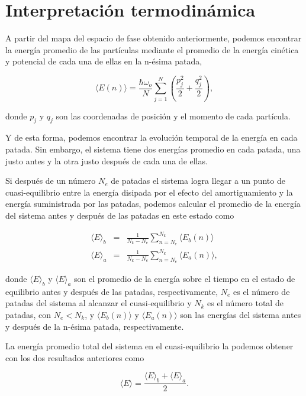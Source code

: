 \documentclass[letterpaper,12pt,oneside]{book}
\begin{document}
	\section{Interpretaci\'on termodin\'amica}
	
	A partir del mapa del espacio de fase obtenido anteriormente, podemos encontrar la energía promedio de las partículas mediante el promedio de la energía cinética y potencial de cada una de ellas en la n-ésima patada,
	
	\begin{equation}
	\langle E(n) \rangle = \frac{\hbar\omega_o}{N}\sum_{j=1}^{N} (\frac{p_j^2}{2} + \frac{q_j^2}{2}),
	\end{equation}
	
	\noindent donde $p_j$ y $q_j$ son las coordenadas de posición y el momento de cada partícula.
	
	
	Y de esta forma, podemos encontrar la evolución temporal de la energía en cada patada. Sin embargo, el sistema tiene dos energías promedio en cada patada, una justo antes y la otra justo después de cada una de ellas.
	
	Si después de un número $N_e$ de patadas el sistema logra llegar a un punto de cuasi-equilibrio entre la energía disipada por el efecto del amortiguamiento y la energía suministrada por las patadas, podemos calcular el promedio de la energía del sistema antes y después de las patadas en este estado como
	
	\begin{eqnarray}
	\langle E \rangle_b &=& \frac{1}{N_k - N_e} \sum_{n = N_e}^{N_k}  \langle E_b(n)\rangle \label{Eq.MHBefore}\\ 
	\langle E \rangle_a &=& \frac{1}{N_k - N_e} \sum_{n = N_e}^{N_k}  \langle E_a(n) \rangle , \label{Eq.MHafter}
	\end{eqnarray}
	
	\noindent donde $\langle E \rangle_b$ y $ \langle E \rangle_a $ son el promedio de la energía sobre el tiempo en el estado de equilibrio antes y después de las patadas, respectivamente, $N_e$ es el número de patadas del sistema al alcanzar el cuasi-equilibrio y $N_k$ es el número total de patadas, con $N_e<N_k$, y $\langle E_b(n) \rangle$ y $\langle E_a(n) \rangle$ son las energías del sistema antes y después de la n-ésima patada, respectivamente.
	
	La energía promedio total del sistema en el cuasi-equilibrio la podemos obtener con los dos resultados anteriores como
	
	\begin{equation}\label{Eq.MeanET}
	\langle E \rangle = \frac{\langle E \rangle_b + \langle E \rangle_a}{2}.
	\end{equation}
	
\end{document}
